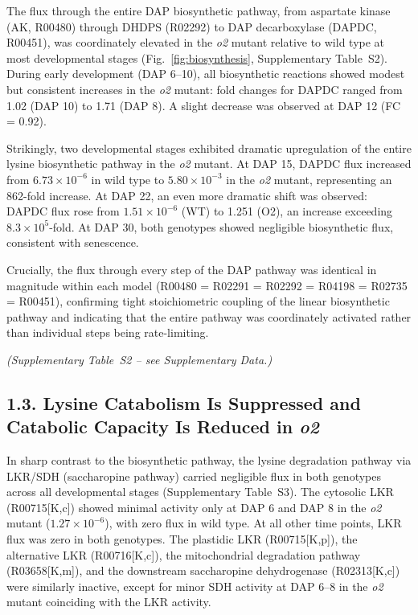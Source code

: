 \documentclass[12pt,a4paper]{article}
\begin{document}
The flux through the entire DAP biosynthetic pathway, from aspartate kinase (AK, R00480) through DHDPS (R02292) to DAP decarboxylase (DAPDC, R00451), was coordinately elevated in the \textit{o2} mutant relative to wild type at most developmental stages (Fig.~\ref{fig:biosynthesis}, Supplementary Table~S2). During early development (DAP 6--10), all biosynthetic reactions showed modest but consistent increases in the \textit{o2} mutant: fold changes for DAPDC ranged from 1.02 (DAP 10) to 1.71 (DAP 8). A slight decrease was observed at DAP 12 (FC = 0.92).

Strikingly, two developmental stages exhibited dramatic upregulation of the entire lysine biosynthetic pathway in the \textit{o2} mutant. At DAP 15, DAPDC flux increased from $6.73 \times 10^{-6}$ in wild type to $5.80 \times 10^{-3}$ in the \textit{o2} mutant, representing an 862-fold increase. At DAP 22, an even more dramatic shift was observed: DAPDC flux rose from $1.51 \times 10^{-6}$ (WT) to 1.251 (O2), an increase exceeding $8.3 \times 10^{5}$-fold. At DAP 30, both genotypes showed negligible biosynthetic flux, consistent with senescence.

Crucially, the flux through every step of the DAP pathway was identical in magnitude within each model (R00480 = R02291 = R02292 = R04198 = R02735 = R00451), confirming tight stoichiometric coupling of the linear biosynthetic pathway and indicating that the entire pathway was coordinately activated rather than individual steps being rate-limiting.


\noindent\textit{(Supplementary Table~S2 -- see Supplementary Data.)}


\subsection{1.3. Lysine Catabolism Is Suppressed and Catabolic Capacity Is Reduced in \textit{o2}}

In sharp contrast to the biosynthetic pathway, the lysine degradation pathway via LKR/SDH (saccharopine pathway) carried negligible flux in both genotypes across all developmental stages (Supplementary Table~S3). The cytosolic LKR (R00715[K,c]) showed minimal activity only at DAP 6 and DAP 8 in the \textit{o2} mutant ($1.27 \times 10^{-6}$), with zero flux in wild type. At all other time points, LKR flux was zero in both genotypes. The plastidic LKR (R00715[K,p]), the alternative LKR (R00716[K,c]), the mitochondrial degradation pathway (R03658[K,m]), and the downstream saccharopine dehydrogenase (R02313[K,c]) were similarly inactive, except for minor SDH activity at DAP 6--8 in the \textit{o2} mutant coinciding with the LKR activity.
\end{document}
